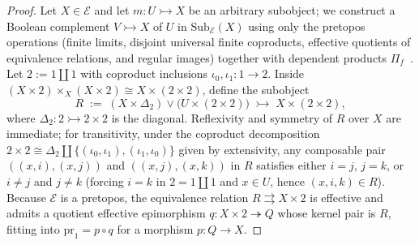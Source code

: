 \begin{proof}
Let $X \in \mathcal{E}$ and let $m : U \rightarrowtail X$ be an arbitrary subobject; we construct a Boolean complement $V \rightarrowtail X$ of $U$ in $\mathrm{Sub}_{\mathcal{E}}(X)$ using only the pretopos operations (finite limits, disjoint universal finite coproducts, effective quotients of equivalence relations, and regular images) together with dependent products $\Pi_f$~\cite{Diaconescu75,Johnstone02,Maietti05}. Let $2 := 1 \amalg 1$ with coproduct inclusions $\iota_0, \iota_1 : 1 \to 2$. Inside $(X \times 2) \times_X (X \times 2) \cong X \times (2 \times 2)$, define the subobject
\[
  R \;:=\; (X \times \Delta_2) \vee \bigl(U \times (2 \times 2)\bigr) \;\rightarrowtail\; X \times (2 \times 2),
\]
where $\Delta_2 : 2 \rightarrowtail 2 \times 2$ is the diagonal. Reflexivity and symmetry of $R$ over $X$ are immediate; for transitivity, under the coproduct decomposition $2 \times 2 \cong \Delta_2 \amalg \{(\iota_0,\iota_1), (\iota_1,\iota_0)\}$ given by extensivity, any composable pair $((x,i),(x,j))$ and $((x,j),(x,k))$ in $R$ satisfies either $i=j$, $j=k$, or $i \neq j$ and $j \neq k$ (forcing $i = k$ in $2 = 1 \amalg 1$ and $x \in U$, hence $(x,i,k) \in R$). Because $\mathcal{E}$ is a pretopos, the equivalence relation $R \rightrightarrows X \times 2$ is effective and admits a quotient effective epimorphism $q : X \times 2 \twoheadrightarrow Q$ whose kernel pair is $R$, fitting into $\mathrm{pr}_1 = p \circ q$ for a morphism $p : Q \to X$.


\end{proof}
